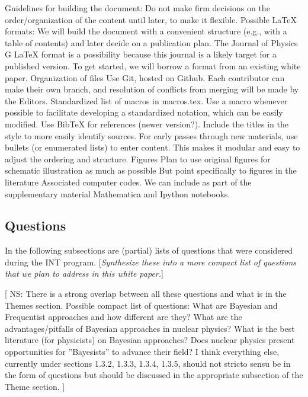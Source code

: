 Guidelines for building the document:
\bi
  \I Do not make firm decisions on the order/organization of the content until later,
      to make it flexible.
  \I Possible LaTeX formats:
     \bi
       \I We will build the document with a convenient structure (e.g., with
          a table of contents) and later decide on a publication plan.
       \I The Journal of Physics G LaTeX format is a possibility because this journal is a 
       likely target for a published version.
       \I To get started, we will borrow a format from an existing white paper. 
     \ei  
  \I Organization of files 
     \bi         
       \I Use Git, hosted on Github.  Each contributor can make their own branch, and
          resolution of conflicts from merging will be made by the Editors.
       \I Standardized list of macros in macros.tex.  Use a macro whenever possible to
          facilitate developing a standardized notation, which can be easily modified.
       \I Use BibTeX for references (newer version?).  Include the titles in the style
           to more easily identify sources.
       \I For early passes through new materials, use bullets (or enumerated lists) to enter content.    This makes it modular and easy to adjust the ordering and structure. 
     \ei  
  \I Figures
     \bi      
       \I Plan to use original figures for schematic illustration as much as possible
       \I But point specifically to figures in the literature  
     \ei  
  \I Associated computer codes.  We can include as part of the supplementary material 
      Mathematica and Ipython notebooks.
\ei


\subsection{Questions} \label{subsec:questions}

In the following subsections are (partial) lists of questions that were considered 
during the INT program.  [\emph{Synthesize these into a more compact list of questions 
that we plan to
address in this white paper.}]

[{\color{red} NS:  There is a strong overlap between all these questions and what is in 
the Themes section. Possible compact list of questions:
\bi
  \I What are Bayesian and Frequentist approaches and how different are they?
  \I What are the advantages/pitfalls of Bayesian approaches in nuclear physics?
  \I What is the best literature (for physicists) on Bayesian approaches?
  \I Does nuclear physics present opportunities for ''Bayesists'' to advance their 
     field?
\ei
I think everything else, currently under sections 1.3.2, 1.3.3, 1.3.4, 1.3.5, should 
not stricto sensu be in the form of questions but should be discussed in the 
appropriate subsection of the Theme section.}
]

